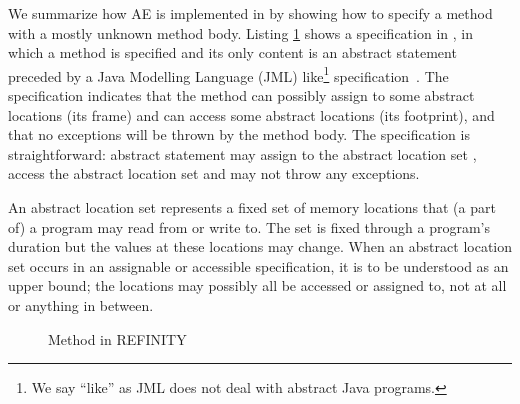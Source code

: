 We summarize how AE is implemented in \Refinity{} by showing how to specify a method  with a mostly unknown method body.
Listing \ref{lst:ExtractVariable-refinity-method} shows a specification in \Refinity{}, in which a method  is specified and its only content is an abstract statement  preceded by a Java Modelling Language (JML) like\footnote{We say ``like'' as JML does not deal with abstract Java programs.} specification~\cite{HuismanAhrendtBruns2014_1000041881}.
%
The specification indicates that the method can possibly assign to some abstract locations (its frame) and can access some abstract locations (its footprint), and that no exceptions will be thrown by the method body.
The specification is straightforward: abstract statement  may assign to the abstract location set , access the abstract location set  and may not throw any exceptions.

An abstract location set represents a fixed set of memory locations that (a part of) a program may read from or write to.
The set is fixed through a program's duration but the values at these locations may change.
When an abstract location set occurs in an assignable or accessible specification, it is to be understood as an upper bound;
the locations may possibly all be accessed or assigned to, not at all or anything in between.

\begin{figure}[tbp]
  \centering
  \captionsetup{type=lstlisting}
  \begin{sublstlisting}{.65\linewidth}
  
  \end{sublstlisting}
  \caption{Method in REFINITY}
  \label{lst:ExtractVariable-refinity-method}
\end{figure}

